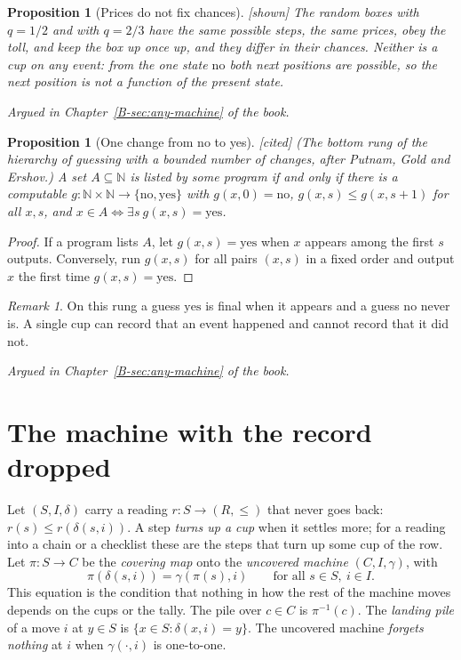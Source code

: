 \documentclass[11pt, a4paper]{article}
\theoremstyle{plain}
\newtheorem{proposition}[theorem]{Proposition}
\theoremstyle{definition}
\theoremstyle{remark}
\newtheorem{remark}[theorem]{Remark}
\newcommand{\N}{\mathbb{N}}
\newcommand{\Bool}{\{\mathrm{no},\mathrm{yes}\}}
\newcommand{\step}{\delta}
\newcommand{\rd}{r}
\newcommand{\inv}{^{-1}}
\newcommand{\argued}[1]{\par\noindent\textit{Argued in Chapter~\ref{B-#1} of the book.}\par}
\newcommand{\kind}[1]{\textup{[#1]}}
\begin{document}
\begin{proposition}[Prices do not fix chances]\label{spec:random-box} \kind{shown}
The random boxes with $q=1/2$ and with $q=2/3$ have the same possible steps, the same prices, obey the toll,
and keep the box up once up, and they differ in their chances. Neither is a cup on any event: from the one
state $\mathrm{no}$ both next positions are possible, so the next position is not a function of the present
state.
\end{proposition}

\argued{sec:any-machine}

\begin{proposition}[One change from no to yes]\label{spec:one-change} \kind{cited}
(The bottom rung of the hierarchy of guessing with a bounded number of changes, after Putnam, Gold and
Ershov.) A set $A\subseteq\N$ is listed by some program if and only if there is a computable
$g:\N\times\N\to\Bool$ with $g(x,0)=\mathrm{no}$, $g(x,s)\le g(x,s+1)$ for all $x,s$, and
$x\in A\Leftrightarrow\exists s\ g(x,s)=\mathrm{yes}$.
\end{proposition}

\begin{proof}
If a program lists $A$, let $g(x,s)=\mathrm{yes}$ when $x$ appears among the first $s$ outputs. Conversely,
run $g(x,s)$ for all pairs $(x,s)$ in a fixed order and output $x$ the first time $g(x,s)=\mathrm{yes}$.
\end{proof}

\begin{remark}
On this rung a guess $\mathrm{yes}$ is final when it appears and a guess $\mathrm{no}$ never is. A single
cup can record that an event happened and cannot record that it did not.
\end{remark}

\argued{sec:any-machine}

\section{The machine with the record dropped}\label{spec:ch15}

Let $(S,I,\step)$ carry a reading $\rd:S\to(R,\le)$ that never goes back: $\rd(s)\le\rd(\step(s,i))$. A
step \emph{turns up a cup} when it settles more; for a reading into a chain or a checklist these are the
steps that turn up some cup of the row. Let $\pi:S\to C$ be the \emph{covering map} onto the \emph{uncovered machine}
$(C,I,\gamma)$, with
\[
\pi(\step(s,i))=\gamma(\pi(s),i)\qquad\text{for all }s\in S,\ i\in I .
\]
This equation is the condition that nothing in how the rest of the machine moves depends on the cups or the
tally. The pile over $c\in C$ is $\pi\inv(c)$. The \emph{landing pile} of a move $i$ at $y\in S$ is
$\{x\in S:\step(x,i)=y\}$. The uncovered machine \emph{forgets nothing} at $i$ when $\gamma(\cdot,i)$ is
one-to-one.
\end{document}
